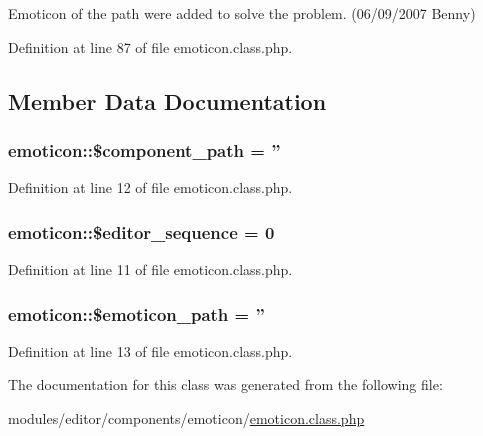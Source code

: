 Emoticon of the path were added to solve the problem. (06/09/2007 Benny) 



Definition at line 87 of file emoticon.\-class.\-php.



\subsection{Member Data Documentation}
\hypertarget{classemoticon_a6553902e718eb62d7f0e1bab0406c653}{
\subsubsection[{\$component\-\_\-path}]{\setlength{\rightskip}{0pt plus 5cm}emoticon\-::\$component\-\_\-path = ''}}\label{classemoticon_a6553902e718eb62d7f0e1bab0406c653}


Definition at line 12 of file emoticon.\-class.\-php.

\hypertarget{classemoticon_ac9b927beccb93f77b8ef28b363841f38}{
\subsubsection[{\$editor\-\_\-sequence}]{\setlength{\rightskip}{0pt plus 5cm}emoticon\-::\$editor\-\_\-sequence = 0}}\label{classemoticon_ac9b927beccb93f77b8ef28b363841f38}


Definition at line 11 of file emoticon.\-class.\-php.

\hypertarget{classemoticon_a21bb58c0d640141cc27203b584f99dd8}{
\subsubsection[{\$emoticon\-\_\-path}]{\setlength{\rightskip}{0pt plus 5cm}emoticon\-::\$emoticon\-\_\-path = ''}}\label{classemoticon_a21bb58c0d640141cc27203b584f99dd8}


Definition at line 13 of file emoticon.\-class.\-php.



The documentation for this class was generated from the following file\-:\begin{DoxyCompactItemize}
\item 
modules/editor/components/emoticon/\hyperlink{emoticon_8class_8php}{emoticon.\-class.\-php}\end{DoxyCompactItemize}
